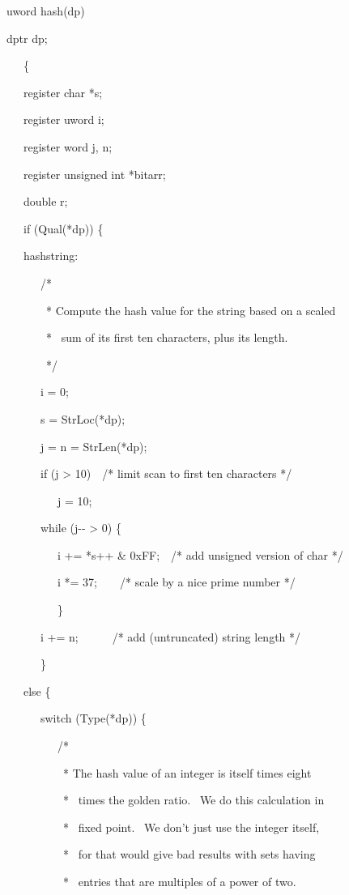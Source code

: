 uword hash(dp)

dptr dp;

\ \ \ \{

\ \ \ register char *s;

\ \ \ register uword i;

\ \ \ register word j, n;

\ \ \ register unsigned int *bitarr;

\ \ \ double r;

\ \ \ if (Qual(*dp)) \{

\ \ \ hashstring:

\ \ \ \ \ \ /*

\ \ \ \ \ \ \ * Compute the hash value for the string based on a scaled 

\ \ \ \ \ \ \ * \ sum of its first ten characters, plus its length.

\ \ \ \ \ \ \ */

\ \ \ \ \ \ i = 0;

\ \ \ \ \ \ s = StrLoc(*dp);

\ \ \ \ \ \ j = n = StrLen(*dp);

\ \ \ \ \ \ if (j {\textgreater} 10)\ \ /* limit scan to first ten characters */

\ \ \ \ \ \ \ \ \ j = 10;

\ \ \ \ \ \ while (j-{}- {\textgreater} 0) \{

\ \ \ \ \ \ \ \ \ i += *s++ \& 0xFF;\ \ /* add unsigned version of char */

\ \ \ \ \ \ \ \ \ i *= 37;\ \ \ \ /* scale by a nice prime number */

\ \ \ \ \ \ \ \ \ \}

\ \ \ \ \ \ i += n;\ \ \ \ \ \ /* add (untruncated) string length */

\ \ \ \ \ \ \}

\ \ \ else \{

\ \ \ \ \ \ switch (Type(*dp)) \{

\ \ \ \ \ \ \ \ \ /*

\ \ \ \ \ \ \ \ \ \ * The hash value of an integer is itself times eight 

\ \ \ \ \ \ \ \ \ \ * \ times the golden ratio. \ We do this calculation in 

\ \ \ \ \ \ \ \ \ \ * \ fixed point. \ We don't just use the integer itself, 

\ \ \ \ \ \ \ \ \ \ * \ for that would give bad results with sets having

\ \ \ \ \ \ \ \ \ \ * \ entries that are multiples of a power of two.

